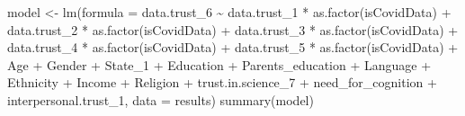 \documentclass[
]{article}
\newenvironment{Shaded}{\begin{snugshade}}{\end{snugshade}}
\newcommand{\AttributeTok}[1]{\textcolor[rgb]{0.77,0.63,0.00}{#1}}
\newcommand{\FunctionTok}[1]{\textcolor[rgb]{0.00,0.00,0.00}{#1}}
\newcommand{\NormalTok}[1]{#1}
\newcommand{\OtherTok}[1]{\textcolor[rgb]{0.56,0.35,0.01}{#1}}
\newcommand{\SpecialCharTok}[1]{\textcolor[rgb]{0.00,0.00,0.00}{#1}}
\begin{document}
\begin{Shaded}
\begin{Highlighting}[]
\NormalTok{model }\OtherTok{\textless{}{-}} \FunctionTok{lm}\NormalTok{(}\AttributeTok{formula =}\NormalTok{ data.trust\_6 }\SpecialCharTok{\textasciitilde{}}\NormalTok{ data.trust\_1 }\SpecialCharTok{*} \FunctionTok{as.factor}\NormalTok{(isCovidData) }\SpecialCharTok{+} 
\NormalTok{              data.trust\_2 }\SpecialCharTok{*} \FunctionTok{as.factor}\NormalTok{(isCovidData) }\SpecialCharTok{+} 
\NormalTok{              data.trust\_3 }\SpecialCharTok{*} \FunctionTok{as.factor}\NormalTok{(isCovidData) }\SpecialCharTok{+} 
\NormalTok{              data.trust\_4 }\SpecialCharTok{*} \FunctionTok{as.factor}\NormalTok{(isCovidData) }\SpecialCharTok{+} 
\NormalTok{              data.trust\_5 }\SpecialCharTok{*} \FunctionTok{as.factor}\NormalTok{(isCovidData) }\SpecialCharTok{+}
\NormalTok{              Age }\SpecialCharTok{+}\NormalTok{ Gender }\SpecialCharTok{+}\NormalTok{ State\_1 }\SpecialCharTok{+}\NormalTok{ Education }\SpecialCharTok{+}\NormalTok{ Parents\_education }\SpecialCharTok{+}\NormalTok{ Language }\SpecialCharTok{+} 
\NormalTok{              Ethnicity }\SpecialCharTok{+}\NormalTok{ Income }\SpecialCharTok{+}\NormalTok{ Religion }\SpecialCharTok{+}\NormalTok{ trust.in.science\_7 }\SpecialCharTok{+} 
\NormalTok{              need\_for\_cognition }\SpecialCharTok{+}\NormalTok{ interpersonal.trust\_1,}
            \AttributeTok{data =}\NormalTok{ results)}
\FunctionTok{summary}\NormalTok{(model)}
\end{Highlighting}
\end{Shaded}
\end{document}
